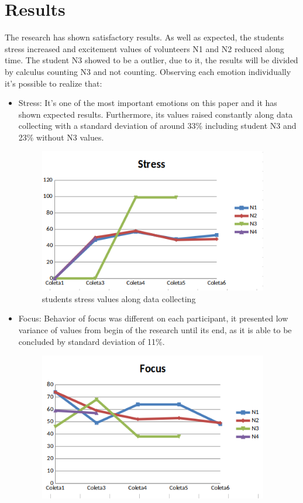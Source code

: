 \documentclass[12pt,openright,a4paper]{article}
\begin{document}
\section{Results}
 The research has shown satisfactory results. As well as expected, the students stress increased and excitement values of volunteers N1 and N2  reduced along time. The student N3 showed to be a outlier, due to it, the results will be divided by calculus counting N3 and not counting.
 Observing each emotion individually it’s possible to realize that:
 \begin{itemize}
 	\item Stress: It’s one of the most important emotions on this paper and it has shown expected results. Furthermore, its values raised constantly along data collecting with a standard deviation of around 33\% including student N3 and 23\% without N3 values.
 	  \begin{figure}[H]
 	  	\centering
 	  	\includegraphics[width=10cm]{./stress.png}
 	  	\caption{students stress values along data collecting}
 	  \end{figure}
 	\item Focus: Behavior of focus was different on each participant, it presented low variance of values from begin of the research until its end, as it is able to be concluded by standard deviation of 11\%.
 	   \begin{figure}[H]
 	  	\centering
 	  	\includegraphics[width=10cm]{./focus.png}

\end{figure}
\end{itemize}
\end{document}
